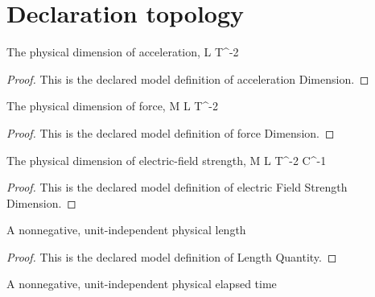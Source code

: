 \section{Declaration topology}
\begin{definition}
  \label{def:physics:phyx-mini-0837:phyxminiproblems-problemphyxmini0837-accelerationdimension}
  The physical dimension of acceleration, L T\textasciicircum{}-2
\end{definition}
\begin{proof}
  This is the declared model definition of acceleration Dimension.
\end{proof}
\begin{definition}
  \label{def:physics:phyx-mini-0837:phyxminiproblems-problemphyxmini0837-forcedimension}
  The physical dimension of force, M L T\textasciicircum{}-2
\end{definition}
\begin{proof}
  This is the declared model definition of force Dimension.
\end{proof}
\begin{definition}
  \label{def:physics:phyx-mini-0837:phyxminiproblems-problemphyxmini0837-electricfieldstrengthdimension}
  The physical dimension of electric-field strength, M L T\textasciicircum{}-2 C\textasciicircum{}-1
\end{definition}
\begin{proof}
  This is the declared model definition of electric Field Strength Dimension.
\end{proof}
\begin{definition}
  \label{def:physics:phyx-mini-0837:phyxminiproblems-problemphyxmini0837-lengthquantity}
  A nonnegative, unit-independent physical length
\end{definition}
\begin{proof}
  This is the declared model definition of Length Quantity.
\end{proof}
\begin{definition}
  \label{def:physics:phyx-mini-0837:phyxminiproblems-problemphyxmini0837-timequantity}
  A nonnegative, unit-independent physical elapsed time
\end{definition}
